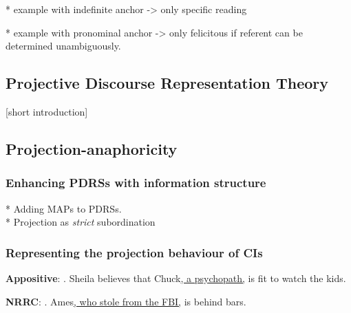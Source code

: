* example with indefinite anchor -> only specific reading

* example with pronominal anchor -> only felicitous if referent can be
  determined unambiguously.




\subsection{Projective Discourse Representation Theory}

[short introduction]

\subsection{Projection-anaphoricity}

\subsubsection{Enhancing PDRSs with information structure}

* Adding MAPs to PDRSs. \\
* Projection as \textit{strict} subordination

\subsubsection{Representing the projection behaviour of CIs}

\noindent 
\parbox[b]{\textwidth}{\textbf{Appositive}:
\ex. Sheila believes that Chuck\underline{, a psychopath,} is fit to watch the kids.\\

}

\noindent\parbox[b]{\textwidth}{\textbf{NRRC}:
\ex. Ames\underline{, who stole from the FBI,} is behind bars.\\

}

